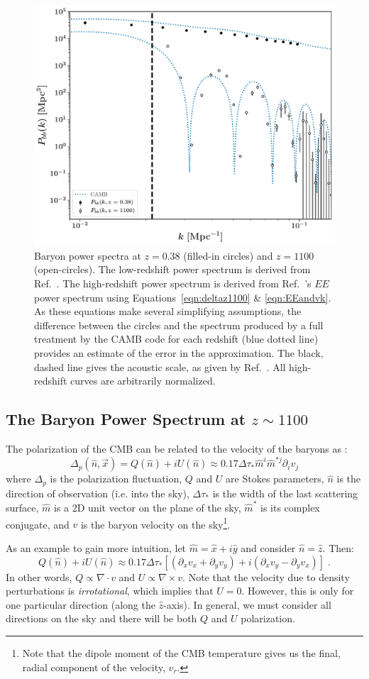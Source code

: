 \documentclass[floats,floatfix,showpacs,amssymb,amsmath,prl,twocolumn,superscriptaddress,nofootinbib, aps]{revtex4-2}
\begin{document}
\begin{figure}[!htb]
    \centering
    \includegraphics[width=.48\textwidth]{power_spectra.pdf}
    \caption{\label{fig:ps} Baryon power spectra at $z=0.38$ (filled-in circles) and $z=1100$ (open-circles). The low-redshift power spectrum is derived from Ref.~\cite{Beutler2016}. The high-redshift power spectrum is derived from Ref.~\cite{Planck2019}'s $EE$ power spectrum using Equations~\ref{eqn:deltaz1100} \& \ref{eqn:EEandvk}. As these equations make several simplifying assumptions, the difference between the circles and the spectrum produced by a full treatment by the CAMB code for each redshift (blue dotted line) provides an estimate of the error in the approximation. The black, dashed line gives the acoustic scale, as given by Ref.~\cite{Planck2018}. All high-redshift curves are arbitrarily normalized.}
\end{figure} 

\subsection{The Baryon Power Spectrum at ${z\sim1100}$}

The polarization of the CMB can be related to the velocity of the baryons as \citep{Zaldarriaga1997}:
\begin{equation}\label{eqn:QU}
\Delta_p(\hat n, \vec{x}) = Q(\hat n) +iU(\hat n) \approx 0.17 \Delta \tau_* \hat m^i \hat m^{*j} \partial_i v_{j}
\end{equation}
where $\Delta_p$ is the polarization fluctuation, $Q$ and $U$ are Stokes parameters, $\hat{n}$ is the direction of observation (i.e. into the sky), $\Delta \tau_{*}$ is the width of the last scattering surface, $\hat{m}$ is a 2D unit vector on the plane of the sky, $\hat{m}^*$ is its complex conjugate, and $v$ is the baryon velocity on the sky\footnote{Note that the dipole moment of the CMB temperature gives us the final, radial component of the velocity, $v_r$.}. 

As an example to gain more intuition, let $\hat{m} = \hat{x} + i\hat{y}$ and consider $\hat{n} = \hat{z}$. Then:
\begin{equation}
    Q(\hat n) +iU(\hat n) \approx 0.17 \Delta \tau_*\left[ (\partial_x v_x + \partial_y v_y) + i(\partial_x v_y - \partial_y v_x)\right] \; .
\end{equation}
In other words, $Q \propto \nabla \cdot v$ and $U \propto \nabla \times v$. Note that the velocity due to density perturbations is \textit{irrotational}, which implies that $U = 0$. However, this is only for one particular direction (along the $\hat{z}$-axis). In general, we must consider all directions on the sky and there will be both $Q$ and $U$ polarization.
\end{document}
